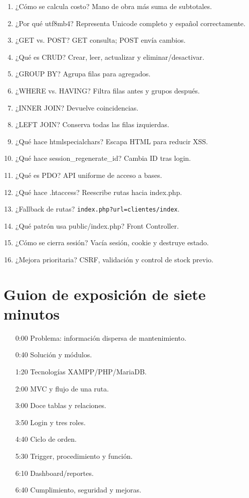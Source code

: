 \documentclass[11pt,a4paper]{report}
\begin{document}
\begin{enumerate}[leftmargin=*]
\item ¿Cómo se calcula costo? Mano de obra más suma de subtotales.
\item ¿Por qué utf8mb4? Representa Unicode completo y español correctamente.
\item ¿GET vs. POST? GET consulta; POST envía cambios.
\item ¿Qué es CRUD? Crear, leer, actualizar y eliminar/desactivar.
\item ¿GROUP BY? Agrupa filas para agregados.
\item ¿WHERE vs. HAVING? Filtra filas antes y grupos después.
\item ¿INNER JOIN? Devuelve coincidencias.
\item ¿LEFT JOIN? Conserva todas las filas izquierdas.
\item ¿Qué hace htmlspecialchars? Escapa HTML para reducir XSS.
\item ¿Qué hace session\_regenerate\_id? Cambia ID tras login.
\item ¿Qué es PDO? API uniforme de acceso a bases.
\item ¿Qué hace .htaccess? Reescribe rutas hacia index.php.
\item ¿Fallback de rutas? \texttt{index.php?url=clientes/index}.
\item ¿Qué patrón usa public/index.php? Front Controller.
\item ¿Cómo se cierra sesión? Vacía sesión, cookie y destruye estado.
\item ¿Mejora prioritaria? CSRF, validación y control de stock previo.
\end{enumerate}
\chapter{Guion de exposición de siete minutos}
\begin{enumerate}\item[0:00] Problema: información dispersa de mantenimiento.\item[0:40] Solución y módulos.\item[1:20] Tecnologías XAMPP/PHP/MariaDB.\item[2:00] MVC y flujo de una ruta.\item[3:00] Doce tablas y relaciones.\item[3:50] Login y tres roles.\item[4:40] Ciclo de orden.\item[5:30] Trigger, procedimiento y función.\item[6:10] Dashboard/reportes.\item[6:40] Cumplimiento, seguridad y mejoras.\end{enumerate}
\end{document}

